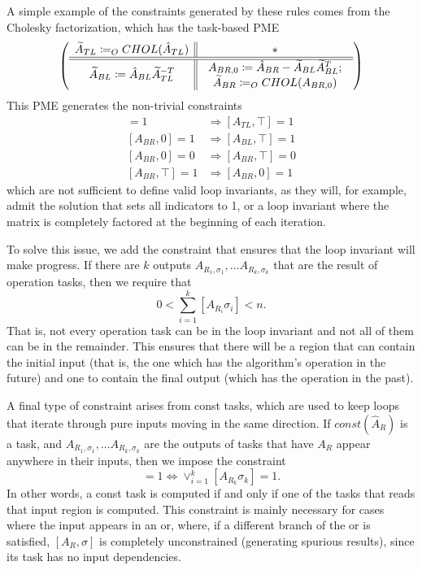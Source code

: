 \documentclass[12pt,letterpaper]{article}
\begin{document}
A simple example of the constraints generated by these rules comes from the Cholesky factorization, which has the task-based PME
\begin{equation*}
  \left( \begin{array}{c || c} \widetilde{A}_{TL} \coloneqq_O CHOL(\hat{A}_{TL}) & * \\ \hline \hline \widetilde{A}_{BL} \coloneqq \hat{A}_{BL}\widetilde{A}_{TL}^{-T} & \begin{array}{c}
     A_{BR, 0} \coloneqq \hat{A}_{BR} - \widetilde{A}_{BL}\widetilde{A}_{BL}^T;\\
     \widetilde{A}_{BR} \coloneqq_O CHOL(A_{BR, 0})
   \end{array} \end{array} \right)
\end{equation*}
This PME generates the non-trivial constraints
\begin{align*}
  [A_{BL}, \top] = 1 &\Rightarrow [A_{TL}, \top] = 1\\
  [A_{BR}, 0] = 1 &\Rightarrow [A_{BL}, \top] = 1\\
  [A_{BR}, 0] = 0 &\Rightarrow [A_{BR}, \top] = 0\\
  [A_{BR}, \top] = 1 &\Rightarrow [A_{BR}, 0] = 1
\end{align*}
which are not sufficient to define valid loop invariants, as they will, for example, admit the solution that sets all indicators to 1, or a loop invariant where the matrix is completely factored at the beginning of each iteration.

To solve this issue, we add the constraint that ensures that the loop invariant will make progress.
If there are $k$ outputs $A_{R_1, \sigma_1}, \ldots A_{R_k, \sigma_k}$ that are the result of operation tasks, then we require that
\begin{equation*}
  0 < \sum_{i = 1}^k [A_{R_i} \sigma_i] < n.
\end{equation*}
That is, not every operation task can be in the loop invariant and not all of them can be in the remainder.
This ensures that there will be a region that can contain the initial input (that is, the one which has the algorithm's operation in the future) and one to contain the final output (which has the operation in the past).

A final type of constraint arises from const tasks, which are used to keep loops that iterate through pure inputs moving in the same direction.
If $const(\hat{A}_R)$ is a task, and $A_{R_1, \sigma_1}, \ldots A_{R_k, \sigma_k}$ are the outputs of tasks that have $A_R$ appear anywhere in their inputs, then we impose the constraint
\begin{equation*}
  [R, \bot] = 1 \Leftrightarrow \vee_{i = 1}^k [A_{R_k} \sigma_k] = 1.
\end{equation*}
In other words, a const task is computed if and only if one of the tasks that reads that input region is computed.
This constraint is mainly necessary for cases where the input appears in an or, where, if a different branch of the or is satisfied, $[A_R, \sigma]$ is completely unconstrained (generating spurious results), since its task has no input dependencies.
\end{document}

